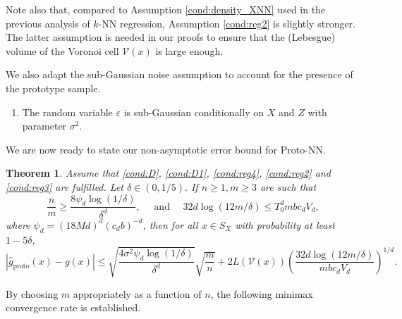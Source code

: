 \documentclass[paper=a4, fontsize=11pt]{scrartcl}
\newtheorem{theorem}{Theorem}
\begin{document}
Note also that, compared to Assumption \ref{cond:density_XNN} used in the previous analysis of $k$-NN regression, Assumption \ref{cond:reg2} is slightly stronger. The latter assumption is needed in our proofs to ensure that the (Lebesgue) volume of the Voronoi cell $\mathcal V(x)$ is large enough. 

We also adapt the sub-Gaussian noise assumption to account for the presence of the prototype sample.

\begin{enumerate}[label=(EZ), wide=0.5em,  leftmargin=*]
  \item  \label{cond:reg3} The random variable $\varepsilon$ is sub-Gaussian conditionally on $X$ and $Z$ with parameter $\sigma^2$.
\end{enumerate}


We are now ready to state our non-asymptotic error bound for Proto-NN.



\begin{theorem}\label{th:main_th_proto}
     Assume that \ref{cond:D}, \ref{cond:D1}, \ref{cond:reg4}, \ref{cond:reg2} and \ref{cond:reg3} are fulfilled. Let $\delta \in (0,1/5).$ If $n \geq 1,m \geq 3$ are such that $$\dfrac{n}{m} \geq \dfrac{8\psi_d\log(1/\delta)}{ \delta^d}, \quad \text{ and } \quad 32 d \log(12m / \delta )  \leq T_0^d  m b c_d V_d, $$
where $\psi_d = (18Md)^d (c_d b)^{-d}$, then for all $x \in S_X$ with probability at least $1- 5\delta$,
    $$|\hat g_{\textrm{proto}} (x) - g(x) | \leq\sqrt{\dfrac{4\sigma^2 \psi_d\log(1/\delta)}{\delta^d }} \sqrt{\dfrac{m}{n}} + 2 L(\mathcal{V}(x))  \left(\frac{ 32d \log(12m/\delta) }{ mb c_d V_d }  \right)^{1/d}.$$
\end{theorem}

By choosing $m$ appropriately as a function of $n$, the following minimax convergence rate is established.

 
\end{document}
